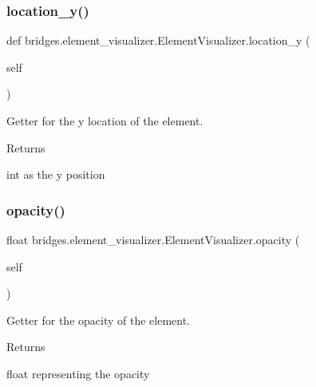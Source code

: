 \subsubsection{\texorpdfstring{location\_y()}{location\_y()}}
{\footnotesize\ttfamily def bridges.\+element\+\_\+visualizer.\+Element\+Visualizer.\+location\+\_\+y (\begin{DoxyParamCaption}\item[{}]{self }\end{DoxyParamCaption})}



Getter for the y location of the element. 

\begin{DoxyReturn}{Returns}


int as the y position 
\end{DoxyReturn}
\mbox{\label{classbridges_1_1element__visualizer_1_1_element_visualizer_aaa4463337cf50610f4ee230bcdf2e483}} 
\subsubsection{\texorpdfstring{opacity()}{opacity()}\hspace{0.1cm}{\footnotesize\ttfamily [1/2]}}
{\footnotesize\ttfamily  float bridges.\+element\+\_\+visualizer.\+Element\+Visualizer.\+opacity (\begin{DoxyParamCaption}\item[{}]{self }\end{DoxyParamCaption})}



Getter for the opacity of the element. 

\begin{DoxyReturn}{Returns}


float representing the opacity 
\end{DoxyReturn}
\mbox{\label{classbridges_1_1element__visualizer_1_1_element_visualizer_ab0fe9377e980e9226e10177036a8d1cf}} 
